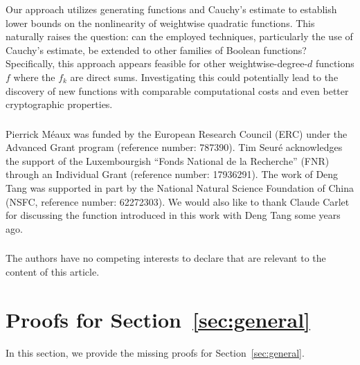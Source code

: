 \documentclass[runningheads,orivec]{llncs}
\begin{document}
    Our approach utilizes generating functions and Cauchy's estimate to establish lower bounds on the nonlinearity of weightwise quadratic functions. This naturally raises the question: can the employed techniques, particularly the use of Cauchy's estimate, be extended to other families of Boolean functions? Specifically, this approach appears feasible for other weightwise-degree-$d$ functions $f$ where the $f_k$ are direct sums. Investigating this could potentially lead to the discovery of new functions with comparable computational costs and even better cryptographic properties.
    
    \begin{credits}
        \subsubsection{\ackname}
    
        Pierrick Méaux was funded by the European Research Council (\textsf{ERC}) under the Advanced Grant program (reference number: 787390). Tim Seuré acknowledges the support of the Luxembourgish “Fonds National de la Recherche” (\textsf{FNR}) through an Individual Grant (reference number: 17936291). The work of Deng Tang was supported in part by the National Natural Science Foundation of China (\textsf{NSFC}, reference number: 62272303). We would also like to thank Claude Carlet for discussing the function introduced in this work with Deng Tang some years ago.

        \subsubsection{\discintname}
        The authors have no competing interests to declare
        that are relevant to the content of this article.
    \end{credits}
    
    \appendix
    
    \section{Proofs for Section~\ref{sec:general}}\label{sec:proofs}
    
    In this section, we provide the missing proofs for Section~\ref{sec:general}.
    
\end{document}
